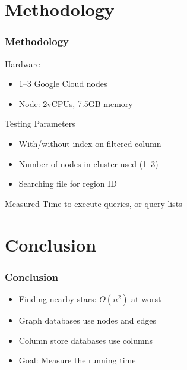 \documentclass[11pt]{beamer}
\begin{document}
    \section{Methodology}\label{sec:methodology}
    \begin{frame}
        \frametitle{Methodology}
        \begin{block}{Hardware}
            \begin{itemize}
                \item 1--3 Google Cloud nodes
                \item Node: 2vCPUs, 7.5GB memory
            \end{itemize}
        \end{block}
        \begin{block}{Testing Parameters}
            \begin{itemize}
                \item With/without index on filtered column
                \item Number of nodes in cluster used (1--3)
                \item Searching file for region ID
            \end{itemize}
        \end{block}
        \begin{block}{Measured}
            Time to execute queries, or query lists
        \end{block}
    \end{frame}

    \section{Conclusion}\label{sec:conclusion}
    \begin{frame}
        \frametitle{Conclusion}
        \begin{itemize}
            \item Finding nearby stars: $O\left(n^2\right)$ at worst \bigskip
            \item Graph databases use nodes and edges \bigskip
            \item Column store databases use columns \bigskip
            \item Goal: Measure the running time
        \end{itemize}
    \end{frame}

    \begin{frame}
    \end{frame}
\end{document}
